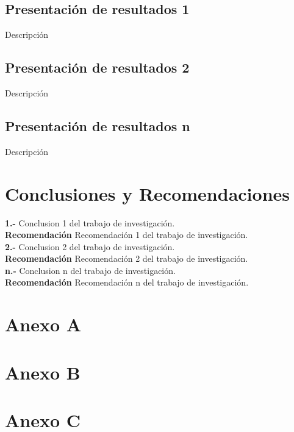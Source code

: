 \documentclass[oneside,11pt]{Latex/Classes/PhDthesisPSnPDF}
\begin{document}
\section{Presentación de resultados 1}

Descripción\\

\section{Presentación de resultados 2}

Descripción\\

\section{Presentación de resultados n}

Descripción\\

\chapter{Conclusiones y Recomendaciones}

\textbf{1.-} Conclusion 1 del trabajo de investigación.\\

\textbf{Recomendación} Recomendación 1 del trabajo de investigación.\\

\textbf{2.-} Conclusion 2 del trabajo de investigación.\\

\textbf{Recomendación} Recomendación 2 del trabajo de investigación.\\

\textbf{n.-} Conclusion n del trabajo de investigación.\\

\textbf{Recomendación} Recomendación n del trabajo de investigación.\\

\appendix
\renewcommand{\thechapter}{\Alph{chapter}}

\chapter{Anexo A}

\chapter{Anexo B}

\chapter{Anexo C}

\renewcommand{\bibname}{Lista de Referencias}
 
 

\end{document}
